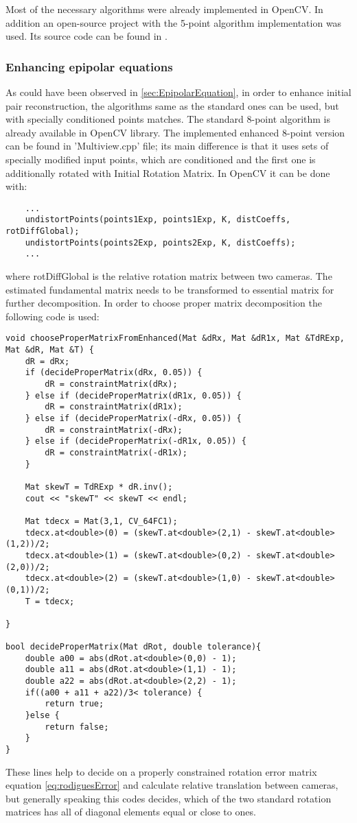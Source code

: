 Most of the necessary algorithms were already implemented in OpenCV. In addition an open-source project with the 5-point algorithm implementation was used. Its source code can be found in \cite{website:relativePoseLibrary}.

\subsubsection{Enhancing epipolar equations}
As could have been observed in \ref{sec:EpipolarEquation}, in order to enhance initial pair reconstruction, the algorithms same as the standard ones can be used, but with specially conditioned points matches. The standard 8-point algorithm is already available in OpenCV library. The implemented enhanced 8-point version can be found in 'Multiview.cpp' file; its main difference is that it uses sets of specially modified input points, which are conditioned and the first one is additionally rotated with Initial Rotation Matrix. In OpenCV it can be done with:
\begin{lstlisting}
    ...
    undistortPoints(points1Exp, points1Exp, K, distCoeffs, rotDiffGlobal);
    undistortPoints(points2Exp, points2Exp, K, distCoeffs);
    ...
\end{lstlisting}
where rotDiffGlobal is the relative rotation matrix between two cameras. The estimated fundamental matrix needs to be transformed to essential matrix for further decomposition. In order to choose proper matrix decomposition the following code is used:
\begin{lstlisting}
void chooseProperMatrixFromEnhanced(Mat &dRx, Mat &dR1x, Mat &TdRExp, Mat &dR, Mat &T) {
    dR = dRx;
    if (decideProperMatrix(dRx, 0.05)) {
        dR = constraintMatrix(dRx);
    } else if (decideProperMatrix(dR1x, 0.05)) {
        dR = constraintMatrix(dR1x);
    } else if (decideProperMatrix(-dRx, 0.05)) {
        dR = constraintMatrix(-dRx);
    } else if (decideProperMatrix(-dR1x, 0.05)) {
        dR = constraintMatrix(-dR1x);
    }

    Mat skewT = TdRExp * dR.inv();
    cout << "skewT" << skewT << endl;

    Mat tdecx = Mat(3,1, CV_64FC1);
    tdecx.at<double>(0) = (skewT.at<double>(2,1) - skewT.at<double>(1,2))/2;
    tdecx.at<double>(1) = (skewT.at<double>(0,2) - skewT.at<double>(2,0))/2;
    tdecx.at<double>(2) = (skewT.at<double>(1,0) - skewT.at<double>(0,1))/2;
    T = tdecx;

}

bool decideProperMatrix(Mat dRot, double tolerance){
    double a00 = abs(dRot.at<double>(0,0) - 1);
    double a11 = abs(dRot.at<double>(1,1) - 1);
    double a22 = abs(dRot.at<double>(2,2) - 1);
    if((a00 + a11 + a22)/3< tolerance) {
        return true;
    }else {
        return false;
    }
}
\end{lstlisting}
These lines help to decide on a properly constrained rotation error matrix equation \ref{eq:rodiguesError} and calculate relative translation between cameras, but generally speaking this codes decides, which of the two standard rotation matrices has all of diagonal elements equal or close to ones.
